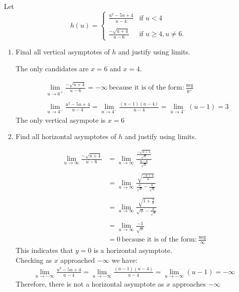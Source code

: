 \documentclass[nooutcomes, handout]{ximera}
\begin{document}
\begin{problem}
Let 
    \[
      h(u) =
      \begin{cases}
        \frac{u^2-5u+4}{u - 4} & \mbox{if $u < 4$}\\ \\
         \frac{-\sqrt{u+4}}{u - 6} & \mbox{if $u \ge 4, u \ne 6$}.
      \end{cases}
    \]

\begin{enumerate}

	
	\item Final all vertical asymptotes of $h$ and justify using limits.

	\begin{freeResponse}
	The only candidates are $x=6$ and $x=4$.
	
	\begin{align*}
	&\lim_{u \to 6^+}\frac{-\sqrt{u+4}}{u - 6}=-\infty\ \text{because it is of the form:}\ \frac{\text{neg}}{0^+}\\ \\
	&\lim_{u \to 4^-} \frac{u^2-5u+4}{u - 4}=\lim_{u \to 4^-} \frac{(u-1)(u-4)}{u - 4}=\lim_{u \to 4^-} (u-1)=3
	\end{align*}
	The only vertical asympote is $x=6$
	\end{freeResponse}
	
	\item Find all horizontal asymptotes of $h$ and justify using limits.
	\begin{freeResponse}
	\begin{align*}
	\lim_{u \to \infty}\frac{-\sqrt{u+4}}{u - 6}&=\lim_{u \to \infty}\frac{\frac{-\sqrt{u+4}}{\sqrt{u}}}{\frac{u - 6}{\sqrt{u}}}\\ \\
	&=\lim_{u \to \infty}\frac{\sqrt{\frac{-u+4}{u}}}{\frac{u}{\sqrt{u}} - \frac{6}{\sqrt{u}}}\\ \\
	&=\lim_{u \to \infty}\frac{\sqrt{1+\frac{4}{u}}}{\sqrt{u} - \frac{6}{\sqrt{u}}}\\ \\
	&=\lim_{u \to \infty}\frac{-1}{\sqrt{u}}\\
	&=0\ \text{because it is of the form:}\ \frac{\text{neg}}{\infty}
	\end{align*}
	This indicates that $y=0$ is a horizontal asymptote.\\
	Checking as $x$ approached $-\infty$ we have:
	\begin{align*}
	\lim_{u \to -\infty}\frac{u^2-5u+4}{u - 4}=\lim_{u \to -\infty} \frac{(u-1)(u-4)}{u - 4}=\lim_{u \to -\infty} (u-1)= -\infty
	\end{align*}
 Therefore, there is not a horizontal asymptote as $x$ approaches $-\infty$
	

\end{freeResponse}
\end{enumerate}
\end{problem}
\end{document}
